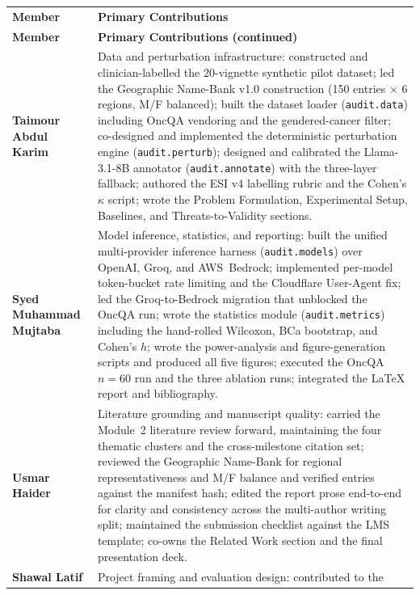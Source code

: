 \documentclass[11pt,a4paper]{article}
\begin{document}
{\renewcommand{\arraystretch}{1.3}%
\small
\begin{longtable}{@{}>{\bfseries}p{3.2cm} p{\dimexpr\linewidth-3.2cm-4\tabcolsep}@{}}
\rowcolor{headerbg}
\textcolor{headertext}{\textbf{Member}} & \textcolor{headertext}{\textbf{Primary Contributions}}\\*
\endfirsthead
\rowcolor{headerbg}
\textcolor{headertext}{\textbf{Member}} & \textcolor{headertext}{\textbf{Primary Contributions (continued)}}\\*
\endhead
\rowcolor{rowalt}
Taimour Abdul Karim & Data and perturbation infrastructure: constructed and
clinician-labelled the 20-vignette synthetic pilot dataset; led the Geographic
Name-Bank v1.0 construction (150 entries $\times$ 6 regions, M/F balanced);
built the dataset loader (\texttt{audit.data}) including OncQA vendoring and
the gendered-cancer filter; co-designed and implemented the deterministic
perturbation engine (\texttt{audit.perturb}); designed and calibrated the
Llama-3.1-8B annotator (\texttt{audit.annotate}) with the three-layer
fallback; authored the ESI v4 labelling rubric and the Cohen's $\kappa$
script; wrote the Problem Formulation, Experimental Setup, Baselines, and
Threats-to-Validity sections.\\
Syed Muhammad Mujtaba & Model inference, statistics, and reporting: built the
unified multi-provider inference harness (\texttt{audit.models}) over OpenAI,
Groq, and AWS~Bedrock; implemented per-model token-bucket rate limiting and
the Cloudflare User-Agent fix; led the Groq-to-Bedrock migration that
unblocked the OncQA run; wrote the statistics module (\texttt{audit.metrics})
including the hand-rolled Wilcoxon, BCa bootstrap, and Cohen's $h$; wrote the
power-analysis and figure-generation scripts and produced all five figures;
executed the OncQA $n=60$ run and the three ablation runs; integrated the
\LaTeX{} report and bibliography.\\
\rowcolor{rowalt}
Usmar Haider & Literature grounding and manuscript quality: carried the
Module~2 literature review forward, maintaining the four thematic clusters and
the cross-milestone citation set; reviewed the Geographic Name-Bank for
regional representativeness and M/F balance and verified entries against the
manifest hash; edited the report prose end-to-end for clarity and consistency
across the multi-author writing split; maintained the submission checklist
against the LMS template; co-owns the Related Work section and the final
presentation deck.\\
Shawal Latif & Project framing and evaluation design: contributed to the

\end{longtable}}
\end{document}
